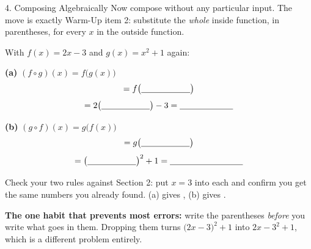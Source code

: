 \documentclass[10pt]{article}
\begin{document}
\begin{notesbox}{4. Composing Algebraically}
Now compose without any particular input. The move is exactly Warm-Up item 2: substitute the
\emph{whole} inside function, in parentheses, for every $x$ in the outside function.

\vspace{3pt}
With $f(x)=2x-3$ and $g(x)=x^{2}+1$ again:
\begin{center}
\begin{minipage}[t]{0.47\linewidth}
\small
\textbf{(a)} $(f\circ g)(x)=f\big(g(x)\big)$
\[ =f\big(\blank{2.0cm}\big) \]
\[ =2\big(\blank{2.0cm}\big)-3=\blank{2.2cm} \]
\end{minipage}
\hfill
\begin{minipage}[t]{0.47\linewidth}
\small
\textbf{(b)} $(g\circ f)(x)=g\big(f(x)\big)$
\[ =g\big(\blank{2.0cm}\big) \]
\[ =\big(\blank{2.0cm}\big)^{2}+1=\blank{3.0cm} \]
\end{minipage}
\end{center}
\vspace{2pt}
Check your two rules against Section 2: put $x=3$ into each and confirm you get the same numbers you
already found. \; (a) gives \blank{1.2cm}, \; (b) gives \blank{1.2cm}. \; \checkmark

\vspace{4pt}
\textbf{The one habit that prevents most errors:} write the parentheses \emph{before} you write what
goes in them. Dropping them turns $\big(2x-3\big)^{2}+1$ into $2x-3^{2}+1$, which is a different
problem entirely.
\end{notesbox}
\end{document}
